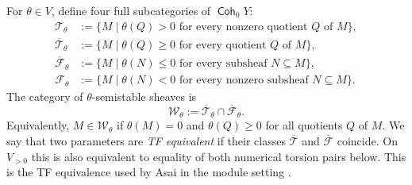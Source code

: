 \documentclass[a4paper,reqno]{amsart}
\def\F{\mathcal{F}}
\def\T{\mathcal{T}}
\def\W{\mathcal{W}}
\DeclareMathOperator{\Coh}{\mathsf{Coh}}
\theoremstyle{definition}
\begin{document}
For $\theta\in V$, define four full subcategories of $\Coh_0Y$:
\begin{equation}\label{eq:numerical-classes}
\begin{aligned}
\T_\theta&:=\{M\mid\theta(Q)>0\text{ for every nonzero quotient }Q\text{ of }M\},\\
\overline{\T}_\theta&:=\{M\mid\theta(Q)\ge0\text{ for every quotient }Q\text{ of }M\},\\
\overline{\F}_\theta&:=\{M\mid\theta(N)\le0\text{ for every subsheaf }N\subseteq M\},\\
\F_\theta&:=\{M\mid\theta(N)<0\text{ for every nonzero subsheaf }N\subseteq M\}.
\end{aligned}
\end{equation}
The category of $\theta$-semistable sheaves is
\[
\W_\theta:=\overline{\T}_\theta\cap\overline{\F}_\theta.
\]
Equivalently, $M\in\W_\theta$ if $\theta(M)=0$ and $\theta(Q)\ge0$ for all quotients $Q$ of $M$. We say that two parameters are \emph{TF equivalent} if their classes $\overline{\T}$ and $\overline{\F}$ coincide. On $V_{>0}$ this is also equivalent to equality of both numerical torsion pairs below. This is the TF equivalence used by Asai in the module setting \cite[Section 2.2]{Asa21}.
\end{document}
